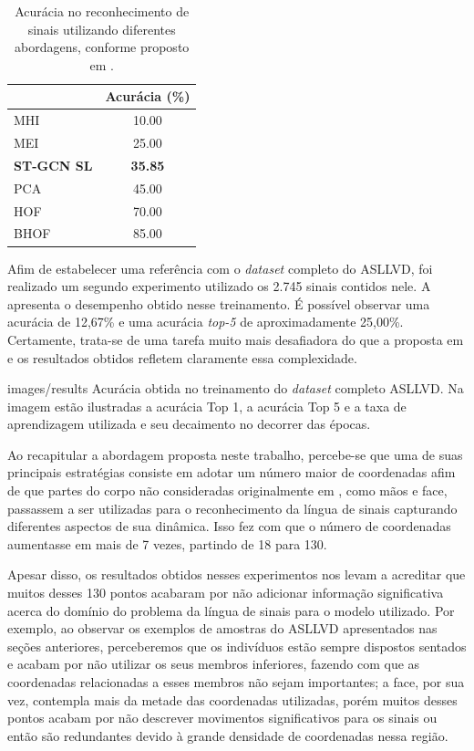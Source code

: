 \begin{table}[ht]
\centering
\caption{Acurácia no reconhecimento de sinais utilizando diferentes abordagens, conforme proposto em \cite{lim-2016}.}
\label{tab:results-comparison-20}
\begin{tabular}{lc}
\hline
                   & Acurácia (\%) \\ \hline
MHI                & 10.00                     \\
MEI                & 25.00                     \\
\textbf{ST-GCN SL} & \textbf{35.85}            \\
PCA                & 45.00                     \\
HOF                & 70.00                     \\
BHOF               & 85.00                     \\ \hline
\end{tabular}
\end{table}



Afim de estabelecer uma referência com o \textit{dataset} completo do ASLLVD, foi realizado um segundo experimento utilizado os 2.745 sinais contidos nele. A  apresenta o desempenho obtido nesse treinamento. É possível observar uma acurácia de 12,67\% e uma acurácia \textit{top-5} de aproximadamente 25,00\%. Certamente, trata-se de uma tarefa muito mais desafiadora do que a proposta em \cite{lim-2016} e os resultados obtidos refletem claramente essa complexidade. 

    {images/results}
    {Acurácia obtida no treinamento do \textit{dataset} completo ASLLVD. Na imagem estão ilustradas a acurácia Top 1, a acurácia Top 5 e a taxa de aprendizagem utilizada e seu decaimento no decorrer das épocas.}


Ao recapitular a abordagem proposta neste trabalho, percebe-se que uma de suas principais estratégias consiste em adotar um número maior de coordenadas afim de que partes do corpo não consideradas originalmente em \cite{st-gcn-2018}, como mãos e face, passassem a ser utilizadas para o reconhecimento da língua de sinais capturando diferentes aspectos de sua dinâmica. Isso fez com que o número de coordenadas aumentasse em mais de 7 vezes, partindo de 18 para 130. 

Apesar disso, os resultados obtidos nesses experimentos nos levam a acreditar que muitos desses 130 pontos acabaram por não adicionar informação significativa acerca do domínio do problema da língua de sinais para o modelo utilizado. Por exemplo, ao observar os exemplos de amostras do ASLLVD apresentados nas seções anteriores, perceberemos que os indivíduos estão sempre dispostos sentados e acabam por não utilizar os seus membros inferiores, fazendo com que as coordenadas relacionadas a esses membros não sejam importantes; a face, por sua vez, contempla mais da metade das coordenadas utilizadas, porém muitos desses pontos acabam por não descrever movimentos significativos para os sinais ou então são redundantes devido à grande densidade de coordenadas nessa região. 

